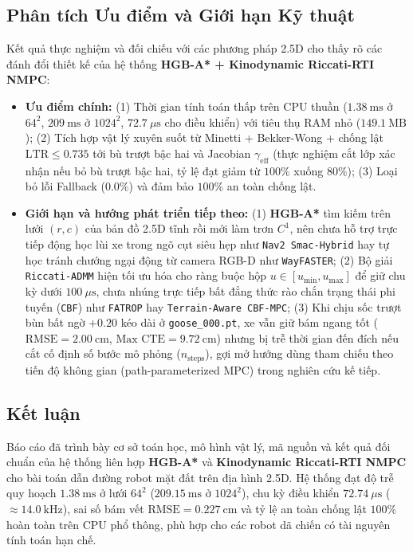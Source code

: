 \documentclass[12pt, a4paper]{article}
\begin{document}
\subsection{Phân tích Ưu điểm và Giới hạn Kỹ thuật}
Kết quả thực nghiệm và đối chiếu với các phương pháp 2.5D cho thấy rõ các đánh đổi thiết kế của hệ thống \textbf{HGB-A* + Kinodynamic Riccati-RTI NMPC}:
\begin{itemize}
    \item \textbf{Ưu điểm chính:} (1) Thời gian tính toán thấp trên CPU thuần ($1.38\ \text{ms}$ ở $64^2$, $209\ \text{ms}$ ở $1024^2$, $72.7\ \mu\text{s}$ cho điều khiển) với tiêu thụ RAM nhỏ ($149.1\ \text{MB}$); (2) Tích hợp vật lý xuyên suốt từ Minetti + Bekker-Wong + chống lật $\text{LTR} \le 0.735$ tới bù trượt bậc hai và Jacobian $\gamma_{\text{eff}}$ (thực nghiệm cắt lớp xác nhận nếu bỏ bù trượt bậc hai, tỷ lệ đạt giảm từ $100\%$ xuống $80\%$); (3) Loại bỏ lỗi Fallback ($0.0\%$) và đảm bảo $100\%$ an toàn chống lật.
    \item \textbf{Giới hạn và hướng phát triển tiếp theo:} (1) \textbf{HGB-A*} tìm kiếm trên lưới $(r,c)$ của bản đồ 2.5D tĩnh rồi mới làm trơn $C^1$, nên chưa hỗ trợ trực tiếp động học lùi xe trong ngõ cụt siêu hẹp như \texttt{Nav2 Smac-Hybrid} hay tự học tránh chướng ngại động từ camera RGB-D như \texttt{WayFASTER}; (2) Bộ giải \texttt{Riccati-ADMM} hiện tối ưu hóa cho ràng buộc hộp $u \in [u_{\min}, u_{\max}]$ để giữ chu kỳ dưới $100\ \mu\text{s}$, chưa nhúng trực tiếp bất đẳng thức rào chắn trạng thái phi tuyến (\texttt{CBF}) như \texttt{FATROP} hay \texttt{Terrain-Aware CBF-MPC}; (3) Khi chịu sốc trượt bùn bất ngờ $+0.20$ kéo dài ở \texttt{goose\_000.pt}, xe vẫn giữ bám ngang tốt ($\text{RMSE} = 2.00\ \text{cm}$, $\text{Max CTE} = 9.72\ \text{cm}$) nhưng bị trễ thời gian đến đích nếu cắt cố định số bước mô phỏng ($n_{\text{steps}}$), gợi mở hướng dùng tham chiếu theo tiến độ không gian (path-parameterized MPC) trong nghiên cứu kế tiếp.
\end{itemize}

\subsection{Kết luận}
Báo cáo đã trình bày cơ sở toán học, mô hình vật lý, mã nguồn và kết quả đối chuẩn của hệ thống liên hợp \textbf{HGB-A*} và \textbf{Kinodynamic Riccati-RTI NMPC} cho bài toán dẫn đường robot mặt đất trên địa hình 2.5D. Hệ thống đạt độ trễ quy hoạch $1.38\ \text{ms}$ ở lưới $64^2$ ($209.15\ \text{ms}$ ở $1024^2$), chu kỳ điều khiển $72.74\ \mu\text{s}$ ($\approx 14.0\ \text{kHz}$), sai số bám vết $\text{RMSE} = 0.227\ \text{cm}$ và tỷ lệ an toàn chống lật $100\%$ hoàn toàn trên CPU phổ thông, phù hợp cho các robot dã chiến có tài nguyên tính toán hạn chế.

\renewcommand{\refname}{Tài liệu tham khảo}


\end{document}
